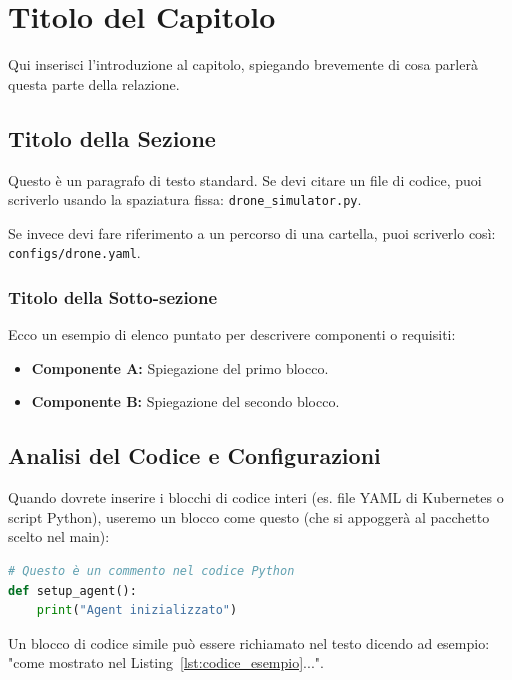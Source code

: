 
\chapter{Titolo del Capitolo}
\label{cap:nome_capitolo}

Qui inserisci l'introduzione al capitolo, spiegando brevemente di cosa parlerà questa parte della relazione.

\section{Titolo della Sezione}
\label{sec:titolo_sezione}

Questo è un paragrafo di testo standard. Se devi citare un file di codice, puoi scriverlo usando la spaziatura fissa: \texttt{drone_simulator.py}. 

Se invece devi fare riferimento a un percorso di una cartella, puoi scriverlo così: \texttt{configs/drone.yaml}.

\subsection{Titolo della Sotto-sezione}
\label{subsec:titolo_sottosezione}

Ecco un esempio di elenco puntato per descrivere componenti o requisiti:
\begin{itemize}
    \item \textbf{Componente A:} Spiegazione del primo blocco.
    \item \textbf{Componente B:} Spiegazione del secondo blocco.
\end{itemize}

\section{Analisi del Codice e Configurazioni}
\label{sec:codice}

Quando dovrete inserire i blocchi di codice interi (es. file YAML di Kubernetes o script Python), useremo un blocco come questo (che si appoggerà al pacchetto scelto nel main):

\begin{lstlisting}[language=Python, caption={Breve descrizione di cosa fa il codice}, label={lst:codice_esempio}]
# Questo è un commento nel codice Python
def setup_agent():
    print("Agent inizializzato")
\end{lstlisting}

Un blocco di codice simile può essere richiamato nel testo dicendo ad esempio: "come mostrato nel Listing~\ref{lst:codice_esempio}...".